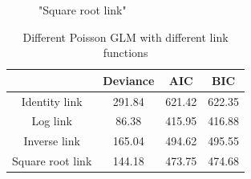 \documentclass[]{article}
\begin{document}
\begin{enumerate}
{\begin{figure}
		\caption{"Square root link"}
		\label{Squ}
	\endminipage\hfill
\end{figure}
\begin{table}
	\centering
	\caption{Different Poisson GLM with different link functions}
	\begin{tabular}{|c|c|c|c|}
		\hline
		& Deviance & AIC & BIC \\
		\hline
		Identity link & 291.84 & 621.42 & 622.35 \\
		\hline
		Log link & 86.38 & 415.95 & 416.88 \\
		\hline
		Inverse link  &165.04 & 494.62 & 495.55 \\
		\hline
		Square root link & 144.18 & 473.75 & 474.68 \\
		\hline
	\end{tabular}
	\label{glm}
\end{table}

}
\end{enumerate}
\end{document}
